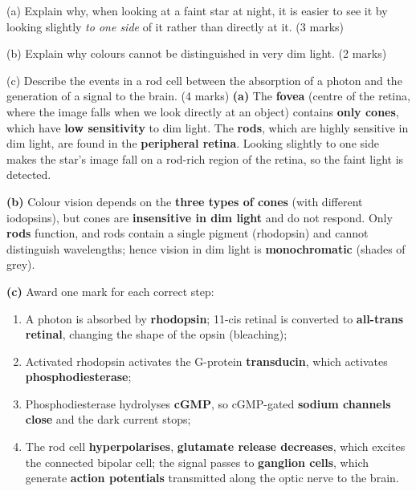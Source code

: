 \documentclass[11pt]{article}
\begin{document}
\begin{exoresolu}
(a) Explain why, when looking at a faint star at night, it is easier to see it by looking slightly \emph{to one side} of it rather than directly at it. \hfill (3 marks)\par
(b) Explain why colours cannot be distinguished in very dim light. \hfill (2 marks)\par
(c) Describe the events in a rod cell between the absorption of a photon and the generation of a signal to the brain. \hfill (4 marks)
\tcblower
\textbf{(a)} The \textbf{fovea} (centre of the retina, where the image falls when we look directly at an object) contains \textbf{only cones}, which have \textbf{low sensitivity} to dim light. The \textbf{rods}, which are highly sensitive in dim light, are found in the \textbf{peripheral retina}. Looking slightly to one side makes the star's image fall on a rod-rich region of the retina, so the faint light is detected.\par
\textbf{(b)} Colour vision depends on the \textbf{three types of cones} (with different iodopsins), but cones are \textbf{insensitive in dim light} and do not respond. Only \textbf{rods} function, and rods contain a single pigment (rhodopsin) and cannot distinguish wavelengths; hence vision in dim light is \textbf{monochromatic} (shades of grey).\par
\textbf{(c)} Award one mark for each correct step:
\begin{enumerate}
\item A photon is absorbed by \textbf{rhodopsin}; 11-cis retinal is converted to \textbf{all-trans retinal}, changing the shape of the opsin (bleaching);
\item Activated rhodopsin activates the G-protein \textbf{transducin}, which activates \textbf{phosphodiesterase};
\item Phosphodiesterase hydrolyses \textbf{cGMP}, so cGMP-gated \textbf{sodium channels close} and the dark current stops;
\item The rod cell \textbf{hyperpolarises}, \textbf{glutamate release decreases}, which excites the connected bipolar cell; the signal passes to \textbf{ganglion cells}, which generate \textbf{action potentials} transmitted along the optic nerve to the brain.
\end{enumerate}
\end{exoresolu}
\end{document}
